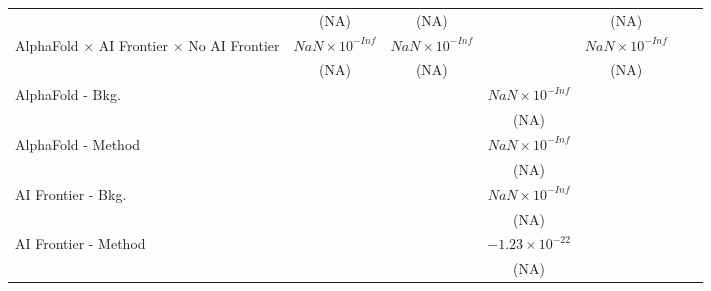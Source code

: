 \begin{tabular}{lcccccc}
                                                                              & (NA)                   & (NA)                   &                         & (NA)                    &      &   \\   
   AlphaFold $\times$ AI Frontier $\times$ No AI Frontier                     & $NaN\times 10^{-Inf}$  & $NaN\times 10^{-Inf}$  &                         & $NaN\times 10^{-Inf}$   &      &   \\   
                                                                              & (NA)                   & (NA)                   &                         & (NA)                    &      &   \\   
   AlphaFold - Bkg.                                                           &                        &                        & $NaN\times 10^{-Inf}$   &                         &      &   \\   
                                                                              &                        &                        & (NA)                    &                         &      &   \\   
   AlphaFold - Method                                                         &                        &                        & $NaN\times 10^{-Inf}$   &                         &      &   \\   
                                                                              &                        &                        & (NA)                    &                         &      &   \\   
   AI Frontier - Bkg.                                                         &                        &                        & $NaN\times 10^{-Inf}$   &                         &      &   \\   
                                                                              &                        &                        & (NA)                    &                         &      &   \\   
   AI Frontier - Method                                                       &                        &                        & $-1.23\times 10^{-22}$  &                         &      &   \\   
                                                                              &                        &                        & (NA)                    &                         &      &   \\   

\end{tabular}

